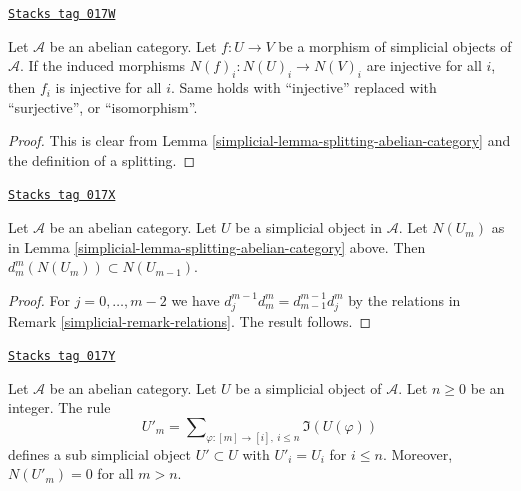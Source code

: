 \begin{lemma}
\label{simplicial-lemma-injective-map-simplicial-abelian}
\href{https://stacks.math.columbia.edu/tag/017W}{\texttt{Stacks tag 017W}}


Let $\mathcal{A}$ be an abelian category.
Let $f : U \to V$ be a morphism of
simplicial objects of $\mathcal{A}$.
If the induced morphisms $N(f)_i : N(U)_i \to N(V)_i$
are injective for all $i$, then $f_i$ is
injective for all $i$. Same holds with ``injective'' replaced
with ``surjective'', or ``isomorphism''.
\end{lemma}

\begin{proof}

This is clear from Lemma \ref{simplicial-lemma-splitting-abelian-category}
and the definition of a splitting.
\end{proof}


\begin{lemma}[N d in N]
\label{simplicial-lemma-N-d-in-N}
\href{https://stacks.math.columbia.edu/tag/017X}{\texttt{Stacks tag 017X}}

Let $\mathcal{A}$ be an abelian category.
Let $U$ be a simplicial object in $\mathcal{A}$.
Let $N(U_m)$ as in Lemma \ref{simplicial-lemma-splitting-abelian-category} above.
Then $d^m_m(N(U_m)) \subset N(U_{m - 1})$.
\end{lemma}

\begin{proof}

For $j = 0, \ldots, m - 2$ we have
$d^{m - 1}_j d^m_m = d^{m - 1}_{m - 1} d^m_j$
by the relations in Remark \ref{simplicial-remark-relations}.
The result follows.
\end{proof}

\begin{lemma}
\label{simplicial-lemma-simplicial-abelian-n-skel-sub}
\href{https://stacks.math.columbia.edu/tag/017Y}{\texttt{Stacks tag 017Y}}

Let $\mathcal{A}$ be an abelian category.
Let $U$ be a simplicial object of $\mathcal{A}$.
Let $n \geq 0$ be an integer.
The rule
$$
U'_m = \sum\nolimits_{\varphi : [m] \to [i], \ i\leq n} \Im(U(\varphi))
$$
defines a sub simplicial object $U' \subset U$ with $U'_i = U_i$
for $i \leq n$.
Moreover, $N(U'_m) = 0$ for all $m > n$.
\end{lemma}

